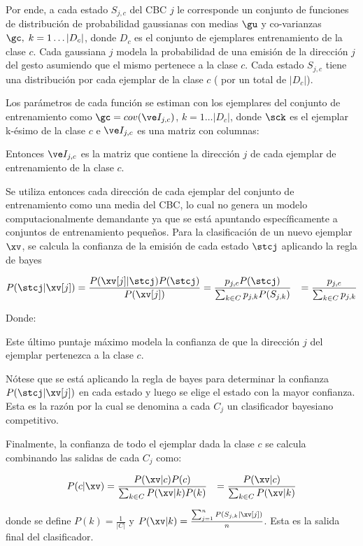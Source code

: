 Por ende, a cada estado $S_{j,c}$ del CBC $j$ le corresponde un conjunto de funciones de distribución de probabilidad gaussianas con medias $\gu$ y co-varianzas $\gc, \; k=1 \dots |D_c|$, donde $D_c$ es el conjunto de ejemplares entrenamiento de la clase $c$. Cada gaussiana $j$ modela la probabilidad de una emisión de la dirección $j$ del gesto asumiendo que el mismo pertenece a la clase $c$. Cada estado $S_{j,c}$ tiene una distribución por cada ejemplar de la clase $c$ ( por un total de $|D_c|$). 

Los parámetros de cada función se estiman con los ejemplares del conjunto de entrenamiento como  $\gc = cov(\mijc) $, $ k= 1  \dots |D_c|$, donde $\sck$ es el ejemplar k-ésimo de la clase $c$ e $\mijc$ es una matriz con columnas: 


Entonces  $\mijc$ es la matriz que contiene la dirección $j$ de cada ejemplar de entrenamiento de la clase $c$.

Se utiliza entonces cada dirección de cada ejemplar del conjunto de entrenamiento como una media del CBC, lo cual no genera un modelo computacionalmente demandante ya que se está apuntando específicamente a conjuntos de entrenamiento pequeños.
Para la clasificación de un nuevo ejemplar $\xv$, se calcula la confianza de la emisión de cada estado $\stcj$ aplicando la regla de bayes

\begin{alignat*}{3}
P(\stcj | \xv[j])= \frac{ P(\xv[j] | \stcj) P(\stcj)}{P(\xv[j])} &= 
\frac{ p_{j,c} P(\stcj)}{\sum_{k \in C} p_{j,k} P(S_{j,k})} &=
\frac{ p_{j,c}}{\sum_{k \in C} p_{j,k}}
\end{alignat*}

Donde:


Este último puntaje máximo modela la confianza de que la dirección $j$ del ejemplar pertenezca a la clase $c$.

Nótese que se está aplicando la regla de bayes para determinar la confianza $P(\stcj | \xv[j])$ en cada estado y luego se elige el estado con la mayor confianza. Esta es la razón por la cual se denomina a cada $C_j$ un clasificador bayesiano competitivo.

Finalmente, la confianza de todo el ejemplar dada la clase $c$ se calcula combinando las salidas de cada $C_j$ como:

\begin{alignat*}{3}
P(c | \xv) &= 
\frac{P(\xv | c) P(c)}{\sum_{k \in C} P(\xv | k) P(k)} &=
\frac{P(\xv | c)}{\sum_{k \in C} P(\xv | k) }
\end{alignat*}

donde se define $P(k)= \frac{1}{|C|} $ y $P(\xv | k) = \frac{\sum_{j=1}^n P (S_{j,k} |\xv[j])}{n}$. Esta es la salida final del clasificador.

